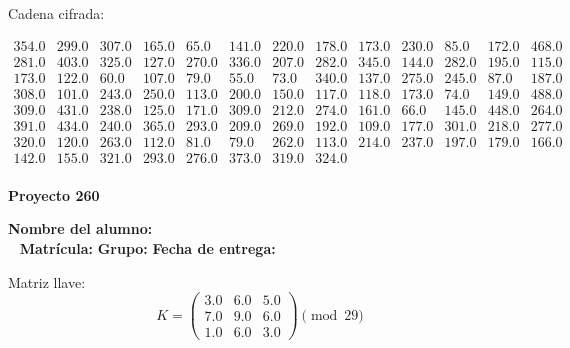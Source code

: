 \documentclass[12pt]{article}
\begin{document}
Cadena cifrada:
\begin{center}
$\begin{array}{lllllllllllll}
354.0 & 299.0 & 307.0 & 165.0 & 65.0 & 141.0 & 220.0 & 178.0 & 173.0 & 230.0 & 85.0 & 172.0 & 468.0\\
281.0 & 403.0 & 325.0 & 127.0 & 270.0 & 336.0 & 207.0 & 282.0 & 345.0 & 144.0 & 282.0 & 195.0 & 115.0\\
173.0 & 122.0 & 60.0 & 107.0 & 79.0 & 55.0 & 73.0 & 340.0 & 137.0 & 275.0 & 245.0 & 87.0 & 187.0\\
308.0 & 101.0 & 243.0 & 250.0 & 113.0 & 200.0 & 150.0 & 117.0 & 118.0 & 173.0 & 74.0 & 149.0 & 488.0\\
309.0 & 431.0 & 238.0 & 125.0 & 171.0 & 309.0 & 212.0 & 274.0 & 161.0 & 66.0 & 145.0 & 448.0 & 264.0\\
391.0 & 434.0 & 240.0 & 365.0 & 293.0 & 209.0 & 269.0 & 192.0 & 109.0 & 177.0 & 301.0 & 218.0 & 277.0\\
320.0 & 120.0 & 263.0 & 112.0 & 81.0 & 79.0 & 262.0 & 113.0 & 214.0 & 237.0 & 197.0 & 179.0 & 166.0\\
142.0 & 155.0 & 321.0 & 293.0 & 276.0 & 373.0 & 319.0 & 324.0\\
\end{array}$
\end{center}

\newpage


\textbf{Proyecto 260}

\textbf{Nombre del alumno:} \underline{\hspace{13cm}}\\\
\vspace{1cm}
\textbf{Matrícula:} \underline{\hspace{4cm}} \hspace{1cm}
\textbf{Grupo:} \underline{\hspace{2cm}}
\textbf{Fecha de entrega:} \underline{\hspace{2cm}}

\medskip

Matriz llave:
\[
K = \begin{pmatrix}
3.0 & 6.0 & 5.0\\
7.0 & 9.0 & 6.0\\
1.0 & 6.0 & 3.0
\end{pmatrix} \pmod{29}
\]
\end{document}
